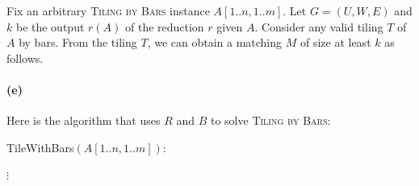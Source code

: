Fix an arbitrary \textsc{Tiling by Bars} instance $A[1..n, 1..m]$. 
Let $G=(U,W,E)$ and $k$ be the output $r(A)$ of the reduction $r$ given $A$.
Consider any valid tiling $T$ of $A$ by bars.
From the tiling $T$, we can obtain a matching $M$ of size at least $k$ as follows.

\begin{blue}
  \REPLACEME
\end{blue}


\paragraph{(e)}


Here is the algorithm that uses $R$ and $B$ to solve \textsc{Tiling by Bars}:

\bigskip

\begin{steps}
\item[] \textsf{TileWithBars}$(A[1..n, 1..m])$:
  \begin{blue}
    \step \REPLACEME
    \step $\vdots$              %
  \end{blue}  
\end{steps}


